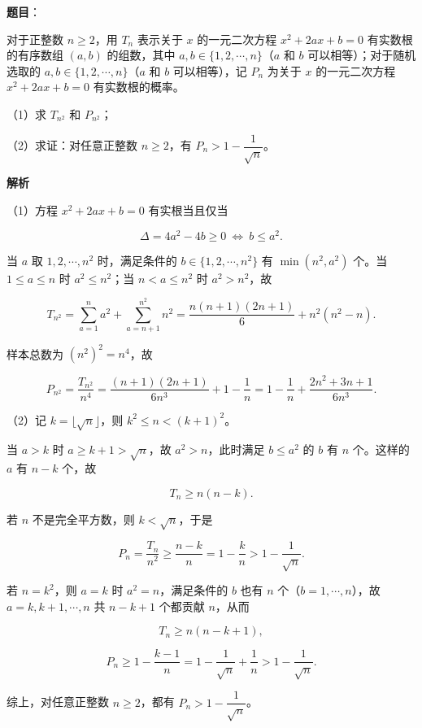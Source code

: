 \begin{answer}

\textbf{题目}：

对于正整数 $n\geqslant2$，用 $T_n$ 表示关于 $x$ 的一元二次方程 $x^2+2ax+b=0$ 有实数根的有序数组 $(a,b)$ 的组数，其中 $a,b\in\{1,2,\cdots,n\}$（$a$ 和 $b$ 可以相等）；对于随机选取的 $a,b\in\{1,2,\cdots,n\}$（$a$ 和 $b$ 可以相等），记 $P_n$ 为关于 $x$ 的一元二次方程 $x^2+2ax+b=0$ 有实数根的概率。

（1）求 $T_{n^2}$ 和 $P_{n^2}$；

（2）求证：对任意正整数 $n\geqslant2$，有 $P_n>1-\dfrac1{\sqrt n}$。

\textbf{解析}

（1）方程 $x^2+2ax+b=0$ 有实根当且仅当

\nopagebreak[4]
\[\Delta=4a^2-4b\geqslant0\ \Longleftrightarrow\ b\leqslant a^2 .\]

当 $a$ 取 $1,2,\cdots,n^2$ 时，满足条件的 $b\in\{1,2,\cdots,n^2\}$ 有 $\min(n^2,a^2)$ 个。当 $1\leqslant a\leqslant n$ 时 $a^2\leqslant n^2$；当 $n<a\leqslant n^2$ 时 $a^2>n^2$，故

\nopagebreak[4]
\[T_{n^2}=\sum_{a=1}^{n}a^2+\sum_{a=n+1}^{n^2}n^2=\frac{n(n+1)(2n+1)}6+n^2(n^2-n).\]

样本总数为 $(n^2)^2=n^4$，故

\nopagebreak[4]
\[P_{n^2}=\frac{T_{n^2}}{n^4}=\frac{(n+1)(2n+1)}{6n^3}+1-\frac1n=1-\frac1n+\frac{2n^2+3n+1}{6n^3}.\]

（2）记 $k=\lfloor\sqrt n\rfloor$，则 $k^2\leqslant n<(k+1)^2$。

当 $a>k$ 时 $a\geqslant k+1>\sqrt n$，故 $a^2>n$，此时满足 $b\leqslant a^2$ 的 $b$ 有 $n$ 个。这样的 $a$ 有 $n-k$ 个，故

\nopagebreak[4]
\[T_n\geqslant n(n-k).\]

若 $n$ 不是完全平方数，则 $k<\sqrt n$，于是

\nopagebreak[4]
\[P_n=\frac{T_n}{n^2}\geqslant\frac{n-k}{n}=1-\frac kn>1-\frac1{\sqrt n}.\]

若 $n=k^2$，则 $a=k$ 时 $a^2=n$，满足条件的 $b$ 也有 $n$ 个（$b=1,\cdots,n$），故 $a=k,k+1,\cdots,n$ 共 $n-k+1$ 个都贡献 $n$，从而

\nopagebreak[4]
\[T_n\geqslant n(n-k+1),\]

\nopagebreak[4]
\[P_n\geqslant1-\frac{k-1}{n}=1-\frac1{\sqrt n}+\frac1n>1-\frac1{\sqrt n}.\]

综上，对任意正整数 $n\geqslant2$，都有 $P_n>1-\dfrac1{\sqrt n}$。


\end{answer}